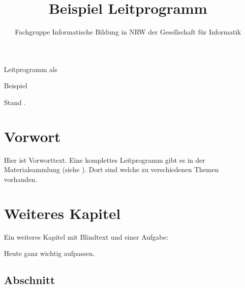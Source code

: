 \documentclass[12pt,a4paper,parskip=half,chapterprefix,bibliography=totoc,footheight=57pt,numbers=noendperiod]{scrreprt}
\title{Beispiel Leitprogramm}
\author{Fachgruppe Informatische Bildung in NRW der Gesellschaft für Informatik}
\begin{document}
    \begin{titlepage}
        \begin{center}
            \begin{Large}
                Leitprogramm als
            \end{Large}
        \end{center}
        \begin{center}
            \begin{huge}
                Beispiel
            \end{huge}
        \end{center}
        \begin{center}
            Stand \gfiGetDay. \monatWort{\gfiGetMonth} \gfiGetYear
        \end{center}
        \vfil
        \begin{center}
        \end{center}
    \end{titlepage}

    \tableofcontents

\chapter{Vorwort}
    Hier ist Vorworttext. Eine komplettes Leitprogramm gibt es in der Materialsammlung (siehe \autocite{Pieper2014}). Dort sind welche zu verschiedenen Themen vorhanden.

    \blindtext

\chapter{Weiteres Kapitel}
    Ein weiteres Kapitel mit Blindtext und einer Aufgabe: \blindtext

    \begin{aufgabe}
        Heute ganz wichtig aufpassen.
    \end{aufgabe}


    \section{Abschnitt}
        \blindtext

        \blindtext
\end{document}
